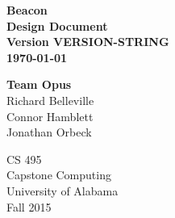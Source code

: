 \begin{titlepage}
    \begin{center}
        \vspace*{50mm}
        \Huge
        \textbf{ Beacon } \\
        \textbf{ Design Document } \\
        \textbf{ Version VERSION-STRING } \\
        \textbf{ \today }
        \vspace{10mm}

        \Huge \textbf{Team Opus} \\
        \vspace{2mm}
        \Large Richard Belleville \\
        \Large Connor Hamblett \\
        \Large Jonathan Orbeck
        \vspace{30mm}

        \huge
        CS 495 \\
        Capstone Computing \\
        University of Alabama \\
        Fall 2015
    \end{center}
\end{titlepage}
